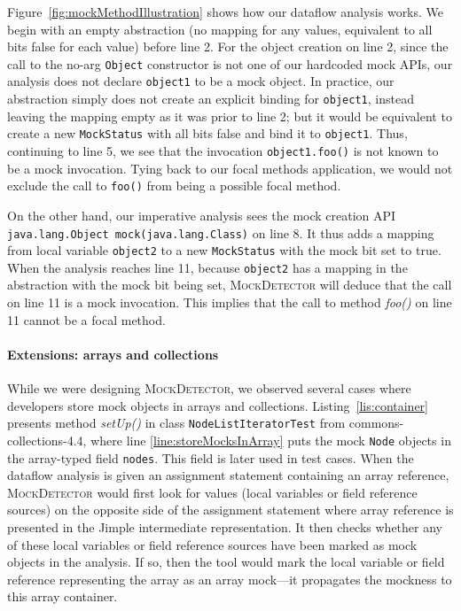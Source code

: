 Figure~\ref{fig:mockMethodIllustration} shows how our dataflow analysis works. We begin with an empty abstraction (no mapping for any values, equivalent to all bits false for each value) before line 2. For the object creation on line 2, since the call to the no-arg \texttt{Object} constructor is not one of our hardcoded mock APIs, our analysis does not declare \texttt{object1} to be a mock object. In practice, our abstraction simply does not create an explicit binding for \texttt{object1}, instead leaving the mapping empty as it was prior to line 2; but it would be equivalent to create a new \texttt{MockStatus} with all bits false and bind it to \texttt{object1}. Thus, continuing to line 5, we see that the invocation \texttt{object1.foo()} is not known to be a mock invocation. Tying back to our focal methods application, we would not exclude the call to \texttt{foo()} from being a possible focal method.

On the other hand, our imperative analysis sees the mock creation API \texttt{java.lang.Object mock(java.lang.Class)} on line 8. It thus adds a mapping from local variable \texttt{object2} to a new \texttt{MockStatus} with the mock bit set to true. When the analysis reaches line 11, because \texttt{object2} has a mapping in the abstraction with the mock bit being set, \textsc{MockDetector} will deduce that the call on line 11 is a mock invocation. This implies that the call to method \textit{foo()} on line 11 cannot be a focal method.

\paragraph{Extensions: arrays and collections} While we were designing \textsc{MockDetector}, we observed several cases where developers store mock objects in arrays and collections. Listing~\ref{lis:container} presents method \textit{setUp()} in class \texttt{NodeListIteratorTest} from commons-collections-4.4, where line \ref{line:storeMocksInArray} puts the mock \texttt{Node} objects in the array-typed field \texttt{nodes}. This field is later used in test cases. When the dataflow analysis is given an assignment statement containing an array reference, \textsc{MockDetector} would first look for values (local variables or field reference sources) on the opposite side of the assignment statement where array reference is presented in the Jimple intermediate representation. It then checks whether any of these local variables or field reference sources have been marked as mock objects in the analysis. If so, then the tool would mark the local variable or field reference representing the array as an array mock---it propagates the mockness to this array container.

